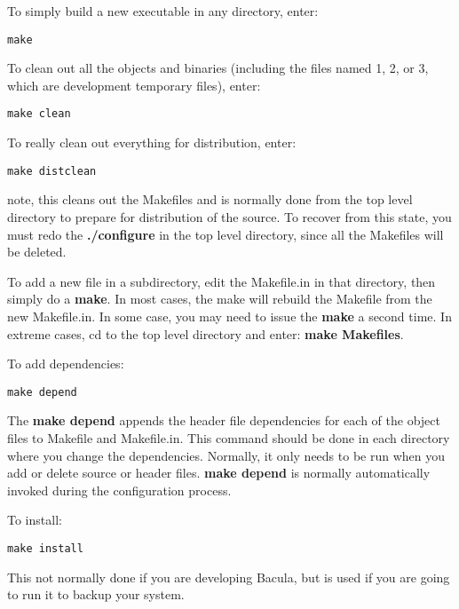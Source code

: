To simply build a new executable in any directory, enter: 

\footnotesize
\begin{verbatim}
make
\end{verbatim}
\normalsize

To clean out all the objects and binaries (including the files named 1, 2, or
3, which are development temporary files), enter: 

\footnotesize
\begin{verbatim}
make clean
\end{verbatim}
\normalsize

To really clean out everything for distribution, enter: 

\footnotesize
\begin{verbatim}
make distclean
\end{verbatim}
\normalsize

note, this cleans out the Makefiles and is normally done from the top level
directory to prepare for distribution of the source. To recover from this
state, you must redo the {\bf ./configure} in the top level directory, since
all the Makefiles will be deleted. 

To add a new file in a subdirectory, edit the Makefile.in in that directory,
then simply do a {\bf make}. In most cases, the make will rebuild the Makefile
from the new Makefile.in. In some case, you may need to issue the {\bf make} a
second time. In extreme cases, cd to the top level directory and enter: {\bf
make Makefiles}. 

To add dependencies: 

\footnotesize
\begin{verbatim}
make depend
\end{verbatim}
\normalsize

The {\bf make depend} appends the header file dependencies for each of the
object files to Makefile and Makefile.in. This command should be done in each
directory where you change the dependencies. Normally, it only needs to be run
when you add or delete source or header files. {\bf make depend} is normally
automatically invoked during the configuration process. 

To install: 

\footnotesize
\begin{verbatim}
make install
\end{verbatim}
\normalsize

This not normally done if you are developing Bacula, but is used if you are
going to run it to backup your system. 


